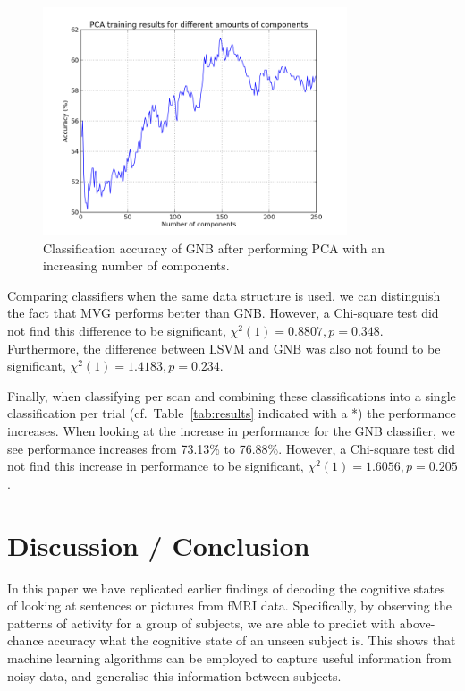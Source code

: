 \documentclass[preprint,journal,11pt]{vgtc}
\begin{document}
\begin{figure}
	\centering
	\includegraphics[width=90mm]{figures/pca_plot_by_index.png}
  	\caption{Classification accuracy of GNB after performing PCA with an increasing number of components.}
  	\label{fig:pca_components}
\end{figure}

Comparing classifiers when the same data structure is used, we can distinguish the fact that MVG performs better than GNB. However, a Chi-square test did not find this difference to be significant, $\chi^2(1) = 0.8807, p = 0.348$. Furthermore, the difference between LSVM and GNB was also not found to be significant, $\chi^2(1) = 1.4183, p = 0.234$.

Finally, when classifying per scan and combining these classifications into a single classification per trial (cf.~Table~\ref{tab:results} indicated with a *) the performance increases. When looking at the increase in performance for the GNB classifier, we see performance increases from 73.13\% to 76.88\%. However, a Chi-square test did not find this increase in performance to be significant, $\chi^2(1) = 1.6056, p = 0.205$.

\section{Discussion / Conclusion}
\label{sec:discussion}

In this paper we have replicated earlier findings of decoding the cognitive states of looking at sentences or pictures from fMRI data. Specifically, by observing the patterns of activity for a group of subjects, we are able to predict with above-chance accuracy what the cognitive state of an unseen subject is. This shows that machine learning algorithms can be employed to capture useful information from noisy data, and generalise this information between subjects.
\end{document}
